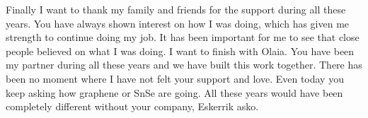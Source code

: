 Finally I want to thank my family and friends for the support during all these years. You have always shown interest 
on how I was doing, which has given me strength to continue doing my job. It has been important for me to see that 
close people believed on what I was doing. I want to finish with Olaia. You have been my partner during all these 
years and we have built this work together. There has been no moment where I have not felt your support and love. 
Even today you keep asking how graphene or SnSe are going. All these years would have been completely different 
without your company, Eskerrik asko. 

